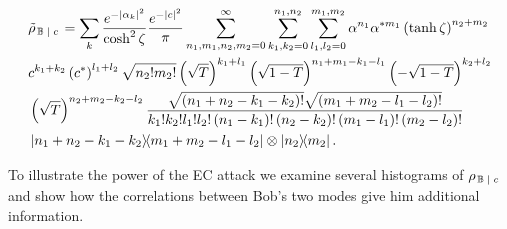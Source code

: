 \begin{align}\label{eqn:appendix_ec_state}
&\tilde{\rho}_{\left. \mathbb{B} \given c\right.} = \sum_k\frac{e^{- \left|\alpha_k\right|^2}}{\cosh^2 \zeta}\frac{e^{-\left|c\right|^2}}{\pi} \sum_{n_1, m_1, n_2, m_2=0}^\infty \sum_{k_1, k_2 = 0}^{n_1, n_2} \sum_{l_1, l_2 = 0}^{m_1, m_2} \alpha^{n_1} \alpha^{* m_1} \left(\tanh{\zeta}\right)^{n_2 + m_2} \notag \\
%
&c^{k_1 + k_2} \left(c^*\right)^{l_1 + l_2} \sqrt{n_2! m_2!} \left(\sqrt{T}\right)^{k_1 + l_1} \left(\sqrt{1-T}\right)^{n_1 + m_1 - k_1 - l_1} \left(- \sqrt{1-T}\right)^{k_2 + l_2} \notag \\ %
&\left( \sqrt{T}\right)^{n_2 + m_2 - k_2 - l_2}
\frac{\sqrt{\left(n_1 + n_2 - k_1 - k_2\right)!} \sqrt{\left(m_1 + m_2 - l_1 - l_2\right)!}}{k_1! k_2! l_1! l_2! \left(n_1 - k_1\right)! \left(n_2 - k_2\right)! \left(m_1 - l_1\right)! \left(m_2 - l_2\right)!} \notag \\
%
& \dyad{n_1 + n_2 - k_1 - k_2}{m_1 + m_2 - l_1 - l_2}\otimes \dyad{n_2}{m_2}.
\end{align}

To illustrate the power of the EC attack we examine several histograms of $\rho_{\left. \mathbb{B} \; \middle| \; c\right.}$ and show how the correlations between Bob's two modes give him additional information. 





%
%
%
%
%
%
%



